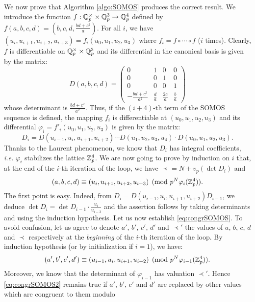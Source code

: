\documentclass{lms}
\begin{document}
We now prove that Algorithm \ref{algo:SOMOS} produces the correct result.
We introduce the function $f : \mathbb Q_p^\times \times \mathbb Q_p^3 \to \mathbb Q_p^4$ defined by 
$f(a,b,c,d) = (b,c,d,\frac{bd+c^2}a)$. For all $i$, we have 
$(u_i, u_{i+1}, u_{i+2}, u_{i+3}) = f_i(u_0, u_1, u_2, u_3)$ where $f_i
= f \circ \cdots \circ f$ ($i$ times). Clearly, $f$ is  
differentiable on $\mathbb Q_p^\times \times \mathbb Q_p^3$ and its differential in the 
canonical basis is given by the matrix:
$$D(a,b,c,d) = \begin{pmatrix}
0 & 1 & 0 & 0 \\
0 & 0 & 1 & 0 \\
0 & 0 & 0 & 1 \\
-\frac{bd+c^2}{a^2} & \frac d a & \frac {2c} a & \frac b a
\end{pmatrix}$$
whose determinant is $\frac{bd+c^2}{a^2}$. Thus, if the $(i+4)$-th term 
of the SOMOS sequence is defined, the mapping $f_i$ is differentiable
at $(u_0, u_1, u_2, u_3)$ and its differential $\varphi_i = 
f'_i(u_0, u_1, u_2, u_3)$ is given by the matrix:
$$D_i = D(u_{i-1}, u_i, u_{i+1}, u_{i+2}) \cdots
D(u_1, u_2, u_3, u_4) \cdot D(u_0, u_1, u_2, u_3).$$
Thanks to the Laurent phenomenon, we know that $D_i$ has
integral coefficients, \emph{i.e.} $\varphi_i$ stabilizes the lattice
$\mathbb Z_p^4$.
We are now going to prove by induction on $i$ that, at the end of the 
$i$-th iteration of the loop, we have $\prec = N + v_p(\det D_i)$ and
\begin{equation}
\label{eq:congrSOMOS}
(a, b, c, d) \equiv (u_i, u_{i+1}, u_{i+2}, u_{i+3}) \pmod
{p^N \varphi_i(\mathbb Z_p^4)}.
\end{equation}
The first point is easy. Indeed, from $D_i = D(u_{i-1}, u_i, u_{i+1}, 
u_{i+2}) D_{i-1}$, we deduce $\det D_i = \det D_{i-1} \cdot 
\frac{u_i}{u_{i-3}}$ and the assertion follows by taking determinants
and using the induction hypothesis. 
Let us now establish \eqref{eq:congrSOMOS}. To avoid confusion, 
let us agree to denote $a'$, $b'$, $c'$, $d'$ and $\prec'$ the values of 
$a$, $b$, $c$, $d$ and $\prec$ respectively at the \emph{beginning} of 
the $i$-th iteration of the loop. By induction hypothesis (or by 
initialization if $i = 1$), we have:
\begin{equation}
\label{eq:congrSOMOS2}
(a', b', c', d') \equiv (u_{i-1}, u_i, u_{i+1}, u_{i+2}) \pmod
{p^N \varphi_{i-1}(\mathbb Z_p^4)}.
\end{equation}
Moreover, we know that the determinant of $\varphi_{i-1}$ has valuation
$\prec'$. Hence \eqref{eq:congrSOMOS2} remains true if $a'$, $b'$, $c'$
and $d'$ are replaced by other values which are congruent to them modulo
\end{document}
